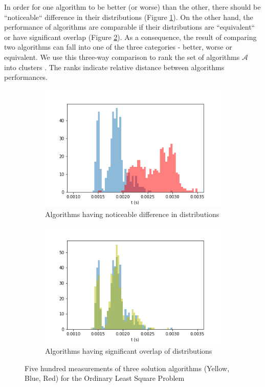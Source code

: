 \documentclass[conference]{IEEEtran}
\begin{document}
In order for one algorithm to be better (or worse) than the other, there should be ``noticeable`` difference in their distributions (Figure \ref{fig:diff}). On the other hand, the performance of algorithms are comparable if their distributions are ``equivalent`` or have significant overlap (Figure \ref{fig:eq}). 
%
As a consequence, the result of comparing two algorithms can fall into one of the three categories - better, worse or equivalent. 
%
%
We use this three-way comparison to rank the set of algorithms $\mathcal{A}$ into clusters . The ranks indicate relative distance between algorithms performances. 
%
\begin{figure}[h!]
	\centering
		\begin{subfigure}[b]{0.5\textwidth}
		\includegraphics[width=1\linewidth]{fig/dif.png}
		\caption{Algorithms having noticeable difference in distributions}
		\label{fig:diff} 
	\end{subfigure}

	\begin{subfigure}[b]{0.5\textwidth}
		\includegraphics[width=1\linewidth]{fig/eq.png}
		\caption{Algorithms having significant overlap of distributions}
		\label{fig:eq}
	\end{subfigure}
	
	\caption{Five hundred measurements of three solution algorithms (Yellow, Blue, Red) for the Ordinary Least Square Problem}
	\label{fig:1}
\end{figure}
\end{document}
